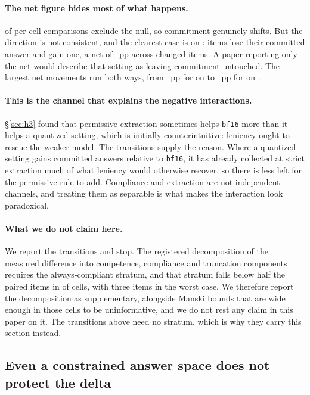 \documentclass[11pt]{article}
\begin{document}
\paragraph{The net figure hides most of what happens.}
\hFourExcludesNull{} of \hFourEffects{} per-cell comparisons exclude the null, so
commitment genuinely shifts. But the direction is not consistent, and the clearest case
is \hFourChurnArm{} on \hFourChurnTask: \hFourChurnLost{} items lose their committed
answer and \hFourChurnGained{} gain one, a net of \hFourChurnNet~pp across
\hFourChurnTotal{} changed items. A paper reporting only the net would describe that
setting as leaving commitment untouched. The largest net movements run both ways, from
\hFourGainNet~pp for \hFourGainArm{} on \hFourGainTask{} to \hFourLossNet~pp for
\hFourLossArm{} on \hFourLossTask.

\paragraph{This is the channel that explains the negative interactions.}
\S\ref{sec:h3} found that permissive extraction sometimes helps \texttt{bf16} more than
it helps a quantized setting, which is initially counterintuitive: leniency ought to
rescue the weaker model. The transitions supply the reason. Where a quantized setting
gains committed answers relative to \texttt{bf16}, it has already collected at strict
extraction much of what leniency would otherwise recover, so there is less left for the
permissive rule to add. Compliance and extraction are not independent channels, and
treating them as separable is what makes the interaction look paradoxical.

\paragraph{What we do not claim here.}
We report the transitions and stop. The registered decomposition of the measured
difference into competence, compliance and truncation components requires the
always-compliant stratum, and that stratum falls below half the paired items in
\hFourStratumBelowHalf{} of \hFourStratumCells{} cells, with three items in the worst
case. We therefore report the decomposition as supplementary, alongside Manski bounds
that are wide enough in those cells to be uninformative, and we do not rest any claim in
this paper on it. The transitions above need no stratum, which is why they carry this
section instead.

\subsection{Even a constrained answer space does not protect the delta}
\label{sec:h5h6}
\end{document}

